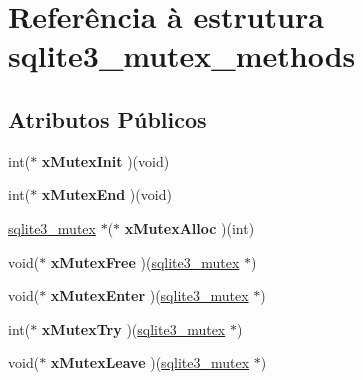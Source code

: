 \hypertarget{structsqlite3__mutex__methods}{\section{Referência à estrutura sqlite3\-\_\-mutex\-\_\-methods}
\label{structsqlite3__mutex__methods}
}
\subsection*{Atributos Públicos}
\begin{DoxyCompactItemize}
\item 
\hypertarget{structsqlite3__mutex__methods_af0a78d79b6029444d4a2ac7c474030d4}{int($\ast$ {\bfseries x\-Mutex\-Init} )(void)}\label{structsqlite3__mutex__methods_af0a78d79b6029444d4a2ac7c474030d4}

\item 
\hypertarget{structsqlite3__mutex__methods_a4963efb4bfede244d4d2a14510dbfe68}{int($\ast$ {\bfseries x\-Mutex\-End} )(void)}\label{structsqlite3__mutex__methods_a4963efb4bfede244d4d2a14510dbfe68}

\item 
\hypertarget{structsqlite3__mutex__methods_a1092d5c1659c494c5235e884def5e275}{\hyperlink{structsqlite3__mutex}{sqlite3\-\_\-mutex} $\ast$($\ast$ {\bfseries x\-Mutex\-Alloc} )(int)}\label{structsqlite3__mutex__methods_a1092d5c1659c494c5235e884def5e275}

\item 
\hypertarget{structsqlite3__mutex__methods_a4e58d446a7225ce91073eb0af91d219a}{void($\ast$ {\bfseries x\-Mutex\-Free} )(\hyperlink{structsqlite3__mutex}{sqlite3\-\_\-mutex} $\ast$)}\label{structsqlite3__mutex__methods_a4e58d446a7225ce91073eb0af91d219a}

\item 
\hypertarget{structsqlite3__mutex__methods_ac60f7bb165e9770949a8a2b2c2632830}{void($\ast$ {\bfseries x\-Mutex\-Enter} )(\hyperlink{structsqlite3__mutex}{sqlite3\-\_\-mutex} $\ast$)}\label{structsqlite3__mutex__methods_ac60f7bb165e9770949a8a2b2c2632830}

\item 
\hypertarget{structsqlite3__mutex__methods_a45682df41bdfcb267a696090c80ebd06}{int($\ast$ {\bfseries x\-Mutex\-Try} )(\hyperlink{structsqlite3__mutex}{sqlite3\-\_\-mutex} $\ast$)}\label{structsqlite3__mutex__methods_a45682df41bdfcb267a696090c80ebd06}

\item 
\hypertarget{structsqlite3__mutex__methods_acfa193f9130bfc68caf7f1849bcd0dac}{void($\ast$ {\bfseries x\-Mutex\-Leave} )(\hyperlink{structsqlite3__mutex}{sqlite3\-\_\-mutex} $\ast$)}\label{structsqlite3__mutex__methods_acfa193f9130bfc68caf7f1849bcd0dac}


\end{DoxyCompactItemize}
